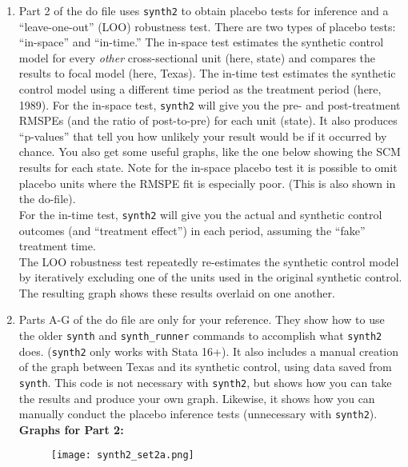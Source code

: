 \documentclass[12pt]{article}
\begin{document}
\begin{enumerate}
\item Part 2 of the do file uses \texttt{synth2} to obtain placebo tests for inference and a ``leave-one-out'' (LOO) robustness test. There are two types of placebo tests: ``in-space'' and ``in-time.'' The in-space test estimates the synthetic control model for every \textit{other} cross-sectional unit (here, state) and compares the results to focal model (here, Texas). The in-time test estimates the synthetic control model using a different time period as the treatment period (here, 1989). For the in-space test, \texttt{synth2} will give you the pre- and post-treatment RMSPEs (and the ratio of post-to-pre) for each unit (state). It also produces ``p-values'' that tell you how unlikely your result would be if it occurred by chance. You also get some useful graphs, like the one below showing the SCM results for each state. Note for the in-space placebo test it is possible to omit placebo units where the RMSPE fit is especially poor. (This is also shown in the do-file). \\

For the in-time test, \texttt{synth2} will give you the actual and synthetic control outcomes (and ``treatment effect'') in each period, assuming the ``fake'' treatment time. \\

The LOO robustness test repeatedly re-estimates the synthetic control model by iteratively excluding one of the units used in the original synthetic control. The resulting graph shows these results overlaid on one another.


\pagebreak
\item Parts A-G of the do file are only for your reference. They show how to use the older \texttt{synth} and \texttt{synth\_runner} commands to accomplish what \texttt{synth2} does. (\texttt{synth2} only works with Stata 16+). It also includes a manual creation of the graph between Texas and its synthetic control, using data saved from \texttt{synth}. This code is not necessary with \texttt{synth2}, but shows how you can take the results and produce your own graph. Likewise, it shows how you can manually conduct the placebo inference tests (unnecessary with \texttt{synth2}).\\

\textbf{Graphs for Part 2:}


\begin{figure}[h!]
\begin{center}
\texttt{[image: synth2\_set2a.png]}
\end{center}
\end{figure}



\end{enumerate}
\end{document}

